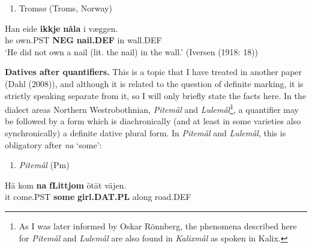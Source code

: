\begin{enumerate} %
\item 
Tromsø (Troms, Norway)

\end{enumerate} %
\ea\label{}
\gll Han  eide  \textbf{ikkje} \textbf{nåla} i  væggen.\\


he  own.PST  \textbf{NEG} \textbf{nail.DEF} in  wall.DEF\\ %


‘He did not own a nail (lit. the nail) in the wall.’ (Iversen (1918: 18))
\z

\textbf{Datives after quantifiers. }This is a topic that I have treated in another paper (Dahl (2008)), and although it is related to the question of definite marking, it is strictly speaking separate from it, so I will only briefly state the facts here. In the dialect areas Northern Westrobothnian, \textit{Pitemål} and \textit{Lulemål}\footnote{ As I was later informed by Oskar Rönnberg, the phenomena described here for \textit{Pitemål} and \textit{Lulemål} are also found in \textit{Kalixmål}\textit{ }as spoken in Kalix.}, a quantifier may be followed by a form which is diachronically (and at least in some varieties also synchronically) a definite dative plural form. In \textit{Pitemål} and \textit{Lulemål}, this is obligatory after \textit{na} ‘some’:

\begin{enumerate} %
\item 
\textit{Pitemål }(Pm)
\end{enumerate} %
\ea\label{}
\gll Hä  kom  \textbf{na}\textbf{  fLi{\textasciigrave}ttjom} ötät  väjen.\\


it  come.PST  \textbf{some} \textbf{girl.DAT.PL} along  road.DEF\\ %


